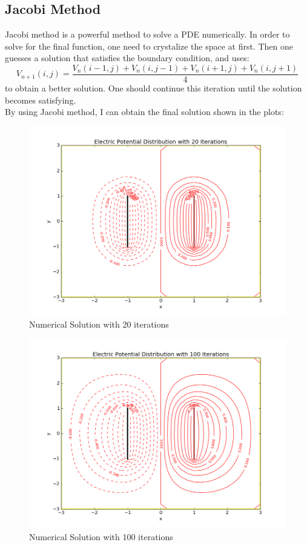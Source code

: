 \documentclass[10pt,a4paper]{article}
\begin{document}
	\subsection{Jacobi Method}
	Jacobi method is a powerful method to solve a PDE numerically. In order to solve for the final function, one need to crystalize the space at first. Then one guesses a solution that satisfies the boundary condition, and uses:
	\begin{equation}
	V_{n+1}(i,j)=\frac{V_{n}(i-1,j)+V_{n}(i,j-1)+V_{n}(i+1,j)+V_{n}(i,j+1)}{4}
	\end{equation}
	to obtain a better solution. One should continue this iteration until the solution becomes satisfying.\\
	By using Jacobi method, I can obtain the final solution shown in the plots:
	\begin{figure}[htbp]
		\centering
		\includegraphics[width=5in]{laplace_2.png}
		\caption{Numerical Solution with 20 iterations}
	\end{figure}
	\begin{figure}[htbp]
		\centering
		\includegraphics[width=5in]{laplace_1.png}
		\caption{Numerical Solution with 100 iterations}
	\end{figure}
\end{document}
